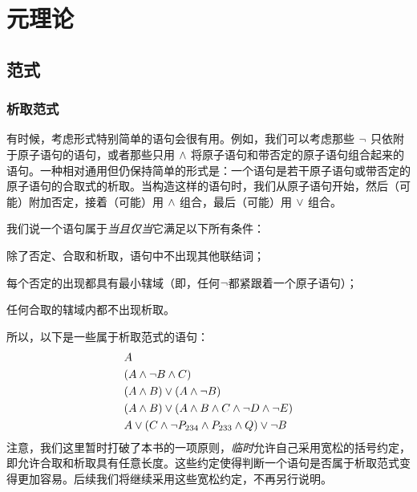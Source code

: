 \part{元理论}
\label{ch.normalform}

\chapter{范式}\label{c:NormalForms}

\section{析取范式}\label{s:DNFDefined}

有时候，考虑形式特别简单的语句会很有用。例如，我们可以考虑那些 $\neg$ 只依附于原子语句的语句，或者那些只用 $\wedge$ 将原子语句和带否定的原子语句组合起来的语句。一种相对通用但仍保持简单的形式是：一个语句是若干原子语句或带否定的原子语句的合取式的析取。当构造这样的语句时，我们从原子语句开始，然后（可能）附加否定，接着（可能）用 $\wedge$ 组合，最后（可能）用 $\vee$ 组合。

我们说一个语句属于\emph{当且仅当}它满足以下所有条件：


\begin{compactlist}
		\item[(\textsc{dnf1})] 除了否定、合取和析取，语句中不出现其他联结词；
		\item[(\textsc{dnf2})] 每个否定的出现都具有最小辖域（即，任何$\neg$都紧跟着一个原子语句）；
		\item[(\textsc{dnf3})] 任何合取的辖域内都不出现析取。
	\end{compactlist}


所以，以下是一些属于析取范式的语句：
\begin{align*}
  & A \\
  & (A \wedge \lnot B \wedge C)\\
  & (A \wedge B) \vee (A \wedge \neg B)\\
  & (A \wedge B) \vee (A \wedge  B \wedge C \wedge \neg D \wedge \neg E)\\
  & A \vee (C \wedge \neg P_{234} \wedge P_{233} \wedge Q) \vee \neg B
\end{align*}
注意，我们这里暂时打破了本书的一项原则，\emph{临时}允许自己采用宽松的括号约定，即允许合取和析取具有任意长度。这些约定使得判断一个语句是否属于析取范式变得更加容易。后续我们将继续采用这些宽松约定，不再另行说明。

